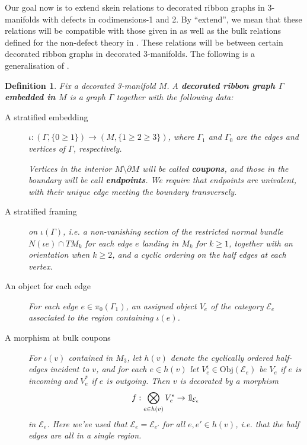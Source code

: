 \documentclass[a4paper]{article}
\numberwithin{equation}{section}
\newtheorem{definition}[counter]{Definition}
\newcommand{\idty}{{\mathrm{1}\mkern-4mu{\mathchoice{}{}{\mskip-0.5mu}{\mskip-1mu}}\mathrm{l}}}
\newcommand{\1}{{\mathrm{1}\mkern-4mu{\mathchoice{}{}{\mskip-0.5mu}{\mskip-1mu}}\mathrm{l}}}
\newcommand{\E}{\mathcal{E}}
\begin{document}
Our goal now is to extend skein relations to decorated ribbon graphs in 3-manifolds with defects in codimensions-1 and 2.
By ``extend'', we mean that these relations will be compatible with those given in \cite{Brown_Jordan_2025} as well as the bulk relations defined for the non-defect theory in \cite{RT1990}. These relations will be between certain decorated ribbon graphs in decorated 3-manifolds. The following is a generalisation of \cite[Def. 2.10]{Brown_Jordan_2025}.
\begin{definition}\label{def:decorated-ribbon-graph}
  Fix a decorated 3-manifold $M$. A \emph{\bf decorated ribbon graph $\Gamma$ embedded in $M$} is a graph $\Gamma$ together with the following data:
  \begin{description}
    \item[A stratified embedding] $\iota : (\Gamma,\{0 \geq 1\}) \to (M,\{1 \geq 2 \geq 3\})$, where $\Gamma_1$ and $\Gamma_0$ are the edges and vertices of $\Gamma$, respectively.

    Vertices in the interior $M\setminus \partial M$ will be called \emph{\bf coupons}, and those in the boundary will be call \emph{\bf endpoints}. We require that endpoints are univalent, with their unique edge meeting the boundary transversely.
  
    \item[A stratified framing] on $\iota(\Gamma)$, i.e. a non-vanishing section of the restricted normal bundle $N(\iota{e}) \cap TM_k$ for each edge $e$ landing in $M_k$ for $k \geq 1$, together with an orientation when $k \geq 2$, and a cyclic ordering on the half edges at each vertex.

    \item[An object for each edge] For each edge $e \in \pi_0(\Gamma_1)$, an assigned object $V_e$ of the category $\mathcal{E}_e$ associated to the region containing $\iota(e)$.  
    \item[A morphism at bulk coupons] For $\iota(v)$ contained in $M_3$, let $h(v)$ denote the cyclically ordered half-edges incident to $v$, and for each $e \in h(v)$ let $V_e^\epsilon \in \mathrm{Obj}(\mathcal{E}_e)$ be $V_e$ if $e$ is incoming and $V_e^*$ if $e$ is outgoing. Then $v$ is decorated by a morphism
      \begin{equation}
        f : \bigotimes_{e \in h(v)} V_e^\epsilon \to \idty_{\mathcal{E}_e}
      \end{equation}
      in $\E_e$. Here we've used that $\mathcal{E}_{e} = \mathcal{E}_{e'}$ for all $e,e' \in h(v)$, i.e. that the half edges are all in a single region.


\end{description}
\end{definition}
\end{document}
